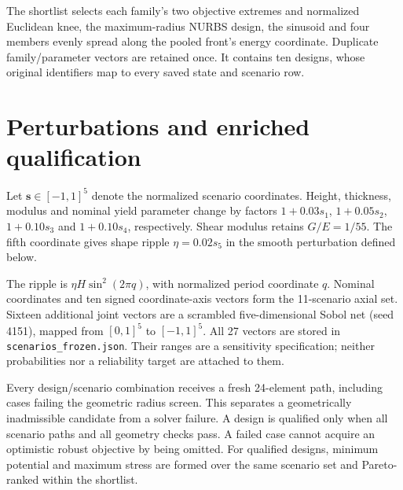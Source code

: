 \documentclass[11pt]{article}
\begin{document}
The shortlist selects each family's two objective extremes and normalized Euclidean knee, the maximum-radius NURBS design, the sinusoid and four members evenly spread along the pooled front's energy coordinate. Duplicate family/parameter vectors are retained once. It contains ten designs, whose original identifiers map to every saved state and scenario row.
\begin{table}[ht]
\centering\small
\caption{Nominal mesh-16 shortlist at $P=7.9$ mm, $H=3.0$ mm and continuous medium volume/area 0.27 mm.}
\resizebox{\textwidth}{!}{}
\end{table}

\section{Perturbations and enriched qualification}
Let $\mathbf s\in[-1,1]^5$ denote the normalized scenario coordinates. Height, thickness, modulus and nominal yield parameter change by factors $1+0.03s_1$, $1+0.05s_2$, $1+0.10s_3$ and $1+0.10s_4$, respectively. Shear modulus retains $G/E=1/55$. The fifth coordinate gives shape ripple $\eta=0.02s_5$ in the smooth perturbation defined below.

\noindent The ripple is $\eta H\sin^2(2\pi q)$, with normalized period coordinate $q$. Nominal coordinates and ten signed coordinate-axis vectors form the 11-scenario axial set. Sixteen additional joint vectors are a scrambled five-dimensional Sobol net (seed 4151), mapped from $[0,1]^5$ to $[-1,1]^5$. All 27 vectors are stored in \texttt{scenarios\_frozen.json}. Their ranges are a sensitivity specification; neither probabilities nor a reliability target are attached to them.

Every design/scenario combination receives a fresh 24-element path, including cases failing the geometric radius screen. This separates a geometrically inadmissible candidate from a solver failure. A design is qualified only when all scenario paths and all geometry checks pass. A failed case cannot acquire an optimistic robust objective by being omitted. For qualified designs, minimum potential and maximum stress are formed over the same scenario set and Pareto-ranked within the shortlist.

\begin{table}[ht]
\centering\small
\caption{Enriched 27-scenario qualification at mesh 24. A front flag refers only to the qualified shortlist.}
\resizebox{\textwidth}{!}{}
\end{table}
\end{document}
